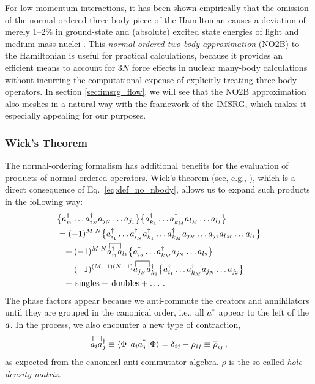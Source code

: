For low-momentum interactions, it has been shown empirically that the omission 
of the normal-ordered three-body piece of the Hamiltonian causes a deviation of merely 
1--2\% in ground-state and (absolute) excited state energies of light and medium-mass 
nuclei \cite{Hagen:2007zc,Roth:2011kx,Roth:2012qf,Binder:2013fk,Gebrerufael:2016fe}. 
This \emph{normal-ordered two-body approximation} (NO2B) to the Hamiltonian is
useful for practical calculations, because it provides an efficient means to 
account for $3N$ force effects in nuclear many-body calculations without incurring 
the computational expense of explicitly treating three-body operators. In section 
\ref{sec:imsrg_flow}, we will see that the NO2B approximation also meshes in a natural 
way with the framework of the IMSRG, which makes it especially appealing for our 
purposes.

%
%
\subsubsection{Wick's Theorem}
The normal-ordering formalism has additional benefits for the evaluation
of products of normal-ordered operators. Wick's theorem (see, e.g., \cite{Shavitt:2009}), 
which is a direct consequence of Eq.~\eqref{eq:def_no_nbody}, allows us to 
expand such products in the following way:
\begin{align}\label{eq:def_wick}
   & \nord{\aaO_{i_1}\ldots\aaO_{i_N}\aO_{j_{N}}\ldots\aO_{j_{1}}} 
     \nord{\aaO_{k_1}\ldots\aaO_{k_M}\aO_{l_{M}}\ldots\aO_{l_{1}}}
   \notag\\
    &=(-1)^{M\cdot N}  
     \nord{\aaO_{i_1}\ldots\aaO_{i_N}\aaO_{k_1}\ldots\aaO_{k_M}\aO_{j_{N}}\ldots\aO_{j_{1}}\aO_{l_{M}}\ldots\aO_{l_{1}}} 
    \notag\\
    &\hphantom{=}
       + (-1)^{M\cdot N}\contraction[1.5ex]{}{\aO}{{}^\dag_{i_1}}{\aO}\aaO_{i_1}\aO_{l_1} 
        \nord{\aaO_{i_2}\ldots\aaO_{k_M}\aO_{j_{N}}\ldots\aO_{l_{2}}} \notag\\
    &\hphantom{\equiv}
      + (-1)^{(M-1)(N-1)}\contraction[1.5ex]{}{\aO}{{}^\dag_{j_N}}{\aO}\aO_{j_N}\aaO_{k_1} 
        \nord{\aaO_{i_1}\ldots\aaO_{k_M}\aO_{j_{N}}\ldots\aO_{j_2}}
      \notag\\
    &\hphantom{=}
      + \text{\,singles}+ \text{\,doubles} + \ldots \,.
\end{align}
The phase factors appear because we anti-commute the creators and 
annihilators until they are grouped in the canonical order, i.e.,
all $a^\dag$ appear to the left of the $a$. In the process, we also 
encounter a new type of contraction,
\begin{equation}\label{eq:def_hole_contraction}
  \contraction[1.5ex]{}{\aO}{{}^\dag_{i}}{\aO}\aO_{i}\aaO_{j} 
  \equiv \matrixe{\Phi}{\aO_{i}\aaO_{j}}{\Phi}
  = \delta_{ij} - \rho_{ij} \equiv \overline{\rho}_{ij}\,,
\end{equation}
as expected from the canonical anti-commutator algebra. $\overline\rho$
is the so-called \emph{hole density matrix}. 

